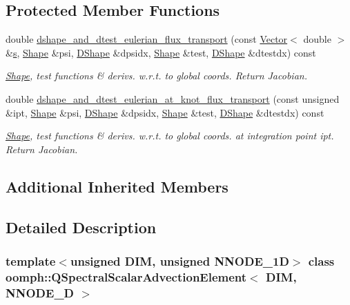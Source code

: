 \subsection*{Protected Member Functions}
\begin{DoxyCompactItemize}
\item 
double \hyperlink{classoomph_1_1QSpectralScalarAdvectionElement_a6cc8f352ebe569b0251345aa6e312729}{dshape\+\_\+and\+\_\+dtest\+\_\+eulerian\+\_\+flux\+\_\+transport} (const \hyperlink{classoomph_1_1Vector}{Vector}$<$ double $>$ \&\hyperlink{cfortran_8h_ab7123126e4885ef647dd9c6e3807a21c}{s}, \hyperlink{classoomph_1_1Shape}{Shape} \&psi, \hyperlink{classoomph_1_1DShape}{D\+Shape} \&dpsidx, \hyperlink{classoomph_1_1Shape}{Shape} \&test, \hyperlink{classoomph_1_1DShape}{D\+Shape} \&dtestdx) const
\begin{DoxyCompactList}\small\item\em \hyperlink{classoomph_1_1Shape}{Shape}, test functions \& derivs. w.\+r.\+t. to global coords. Return Jacobian. \end{DoxyCompactList}\item 
double \hyperlink{classoomph_1_1QSpectralScalarAdvectionElement_ad6e292ae057d0ed3f3e9990fa35f9bcc}{dshape\+\_\+and\+\_\+dtest\+\_\+eulerian\+\_\+at\+\_\+knot\+\_\+flux\+\_\+transport} (const unsigned \&ipt, \hyperlink{classoomph_1_1Shape}{Shape} \&psi, \hyperlink{classoomph_1_1DShape}{D\+Shape} \&dpsidx, \hyperlink{classoomph_1_1Shape}{Shape} \&test, \hyperlink{classoomph_1_1DShape}{D\+Shape} \&dtestdx) const
\begin{DoxyCompactList}\small\item\em \hyperlink{classoomph_1_1Shape}{Shape}, test functions \& derivs. w.\+r.\+t. to global coords. at integration point ipt. Return Jacobian. \end{DoxyCompactList}\end{DoxyCompactItemize}
\subsection*{Additional Inherited Members}


\subsection{Detailed Description}
\subsubsection*{template$<$unsigned D\+IM, unsigned N\+N\+O\+D\+E\+\_\+1D$>$\newline
class oomph\+::\+Q\+Spectral\+Scalar\+Advection\+Element$<$ D\+I\+M, N\+N\+O\+D\+E\+\_\+D $>$}



